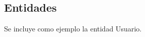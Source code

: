 \subsection{\forlnameref Entidades}
\label{sec:entities}

\begin{shaded}
Se incluye como ejemplo la entidad Usuario.
\end{shaded}

\def \irqName {Usuario}
\def \irqDescription {Usuario básico de la aplicación.}
\def \irqNumAttrs {5} %
\def \irqAttrs { 
    & Nombre        & \code{texto(64)}  &            & \checkmark   \\ \cline{2-5}
    & Apellidos     & \code{texto(128)} &            & \checkmark   \\ \cline{2-5}
    & Usuario       & \code{texto(16)}  & \checkmark & \checkmark   \\ \cline{2-5}
    & Contraseña    & \code{texto(16)}  &            & \checkmark   \\ \cline{2-5}
    \irqTitle & Contactos  & \code{lista<Contacto>}  &     & \checkmark     \\ \hline
}

